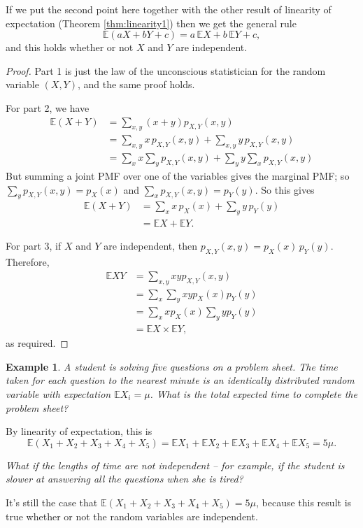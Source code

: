 \documentclass[
  a4paper,
]{book}
\theoremstyle{definition}
\theoremstyle{definition}
\newtheorem{example}{Example}[chapter]
\theoremstyle{definition}
\theoremstyle{definition}
\theoremstyle{remark}
\begin{document}
If we put the second point here together with the other result of linearity of expectation (Theorem \ref{thm:linearity1}) then we get the general rule
\[ \mathbb E(aX + bY + c) = a\,\mathbb EX + b \,\mathbb EY + c , \]
and this holds whether or not \(X\) and \(Y\) are independent.

\begin{proof}
Part 1 is just the law of the unconscious statistician for the random variable \((X,Y)\), and the same proof holds.

For part 2, we have
\begin{align*}
\mathbb E(X + Y) &= \sum_{x,y} (x + y)p_{X,Y}(x,y) \\
  &= \sum_{x,y} x\,p_{X,Y}(x,y) + \sum_{x,y} y\,p_{X,Y}(x,y) \\
  &= \sum_x x \sum_y p_{X,Y}(x,y) + \sum_y y \sum_x p_{X,Y}(x,y)
\end{align*}
But summing a joint PMF over one of the variables gives the marginal PMF; so \(\sum_y p_{X,Y}(x,y) = p_X(x)\) and \(\sum_x p_{X,Y}(x,y) = p_Y(y)\). So this gives
\begin{align*}
\mathbb E(X + Y) &= \sum_x x\, p_X(x) + \sum_y y\,p_Y(y) \\
&= \mathbb EX + \mathbb EY .
\end{align*}

For part 3, if \(X\) and \(Y\) are independent, then \(p_{X,Y}(x,y) = p_X(x) \, p_Y(y)\). Therefore,
\begin{align*}
\mathbb EXY &= \sum_{x,y} xy p_{X,Y}(x,y) \\
  &= \sum_x \sum_y xy p_X(x) p_Y(y) \\
  &= \sum_x x p_X(x) \sum_y y p_Y(y) \\
  &= \mathbb EX \times \mathbb EY,
\end{align*}
as required.
\end{proof}

\begin{example}
\emph{A student is solving five questions on a problem sheet. The time taken for each question to the nearest minute is an identically distributed random variable with expectation \(\mathbb EX_i = \mu\). What is the total expected time to complete the problem sheet?}

By linearity of expectation, this is
\[ \mathbb E(X_1 + X_2 + X_3 + X_4 + X_5) = \mathbb EX_1 + \mathbb EX_2 + \mathbb EX_3 + \mathbb EX_4 + \mathbb EX_5 = 5\mu . \]

\emph{What if the lengths of time are not independent -- for example, if the student is slower at answering all the questions when she is tired?}

It's still the case that \(\mathbb E(X_1 + X_2 + X_3 + X_4 + X_5) = 5\mu\), because this result is true whether or not the random variables are independent.
\end{example}
\end{document}
